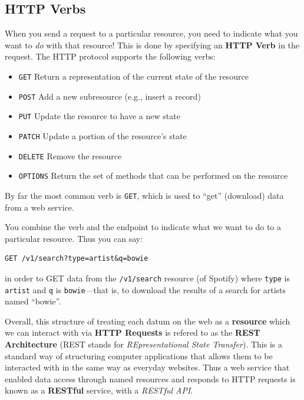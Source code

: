 \documentclass[]{book}
\providecommand{\tightlist}{%
  \setlength{\itemsep}{0pt}\setlength{\parskip}{0pt}}
\theoremstyle{definition}
\theoremstyle{definition}
\theoremstyle{remark}
\begin{document}
\subsection{HTTP Verbs}\label{http-verbs}

When you send a request to a particular resource, you need to indicate
what you want to \emph{do} with that resource! This is done by
specifying an \textbf{HTTP Verb} in the request. The HTTP protocol
supports the following verbs:

\begin{itemize}
\tightlist
\item
  \texttt{GET} Return a representation of the current state of the
  resource
\item
  \texttt{POST} Add a new subresource (e.g., insert a record)
\item
  \texttt{PUT} Update the resource to have a new state
\item
  \texttt{PATCH} Update a portion of the resource's state
\item
  \texttt{DELETE} Remove the resource
\item
  \texttt{OPTIONS} Return the set of methods that can be performed on
  the resource
\end{itemize}

By far the most common verb is \texttt{GET}, which is used to ``get''
(download) data from a web service.

You combine the verb and the endpoint to indicate what we want to do to
a particular resource. Thus you can say:

\begin{verbatim}
GET /v1/search?type=artist&q=bowie
\end{verbatim}

in order to GET data from the \texttt{/v1/search} resource (of Spotify)
where \texttt{type} is \texttt{artist} and \texttt{q} is
\texttt{bowie}---that is, to download the results of a search for
artists named ``bowie''.

Overall, this structure of treating each datum on the web as a
\textbf{resource} which we can interact with via \textbf{HTTP Requests}
is refered to as the \textbf{REST Architecture} (REST stands for
\emph{REpresentational State Transfer}). This is a standard way of
structuring computer applications that allows them to be interacted with
in the same way as everyday websites. Thus a web service that enabled
data access through named resources and responds to HTTP requests is
known as a \textbf{RESTful} service, with a \emph{RESTful API}.
\end{document}
